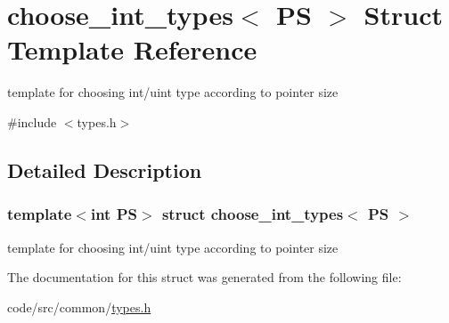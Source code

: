 \hypertarget{structchoose__int__types}{}\section{choose\+\_\+int\+\_\+types$<$ PS $>$ Struct Template Reference}
\label{structchoose__int__types}


template for choosing int/uint type according to pointer size  




{\ttfamily \#include $<$types.\+h$>$}



\subsection{Detailed Description}
\subsubsection*{template$<$int PS$>$\newline
struct choose\+\_\+int\+\_\+types$<$ P\+S $>$}

template for choosing int/uint type according to pointer size 

The documentation for this struct was generated from the following file\+:\begin{DoxyCompactItemize}
\item 
code/src/common/\hyperlink{types_8h}{types.\+h}\end{DoxyCompactItemize}
